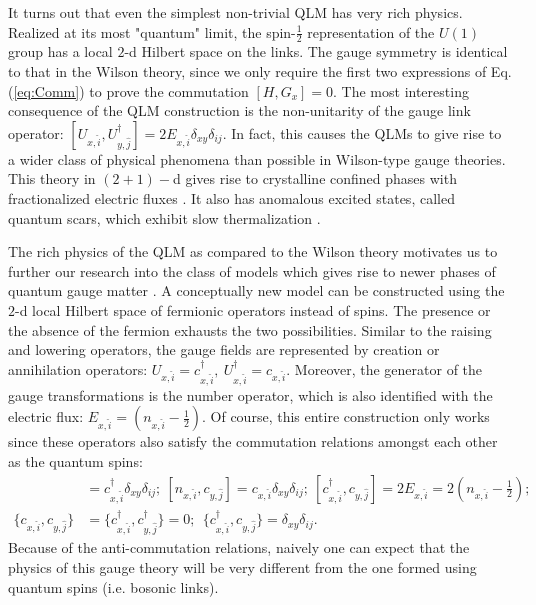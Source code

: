 \documentclass[a4paper,11pt]{article}
\begin{document}
 It turns out that even the simplest non-trivial QLM has very rich physics. Realized at its most "quantum"
limit, the spin-$\frac{1}{2}$ representation of the $U(1)$ group has a local $2$-d Hilbert space on the links. The 
gauge symmetry is identical to that in the Wilson theory, since we only require the first two expressions
of Eq. (\ref{eq:Comm}) to prove the commutation $[H,G_{x}] = 0$. The most interesting consequence of the 
QLM construction is the non-unitarity of the gauge link operator: 
$[U_{x,\hat{i}}, U_{y,\hat{j}}^\dagger] = 2 E_{x,\hat{i}} \delta_{xy} \delta_{ij}$. In fact, this causes the 
QLMs to give rise to a wider class of physical phenomena than possible in Wilson-type gauge theories.
This theory in $(2+1)-$d gives rise to crystalline confined phases with fractionalized electric fluxes 
\cite{Banerjee2013,Banerjee2021}. It also has anomalous excited states, called quantum scars, which exhibit slow
thermalization \cite{Banerjee2020}.
 
  The rich physics of the QLM as compared to the Wilson theory motivates us to further our research into the class
of models which gives rise to newer phases of quantum gauge matter \cite{Flink2021}. 
A conceptually new model can be constructed using the $2$-d local Hilbert space of fermionic operators instead of 
spins. The presence or the absence of the fermion exhausts the two possibilities. Similar to the raising and lowering 
operators, the gauge fields are represented by creation or annihilation operators: 
$U_{x,\hat{i}} = c^\dagger_{x,\hat{i}},~U^\dagger_{x,\hat{i}} = c_{x,\hat{i}}$. Moreover, the generator of the
gauge transformations is the number operator, which is also identified with the electric flux: 
$E_{x,\hat{i}} = (n_{x,\hat{i}} - \frac{1}{2})$. Of course, this entire construction only works since these 
operators also satisfy the commutation relations amongst each other as the quantum spins:
\begin{align}
[n_{x,\hat{i}}, c^\dagger_{y,\hat{j}}] &= c^\dagger_{x,\hat{i}} \delta_{xy} \delta_{ij};~
[n_{x,\hat{i}}, c_{y,\hat{j}}] = c_{x,\hat{i}} \delta_{xy} \delta_{ij};~
[c^\dagger_{x,\hat{i}}, c_{y,\hat{j}}] = 2 E_{x,\hat{i}} = 2 (n_{x,\hat{i}} - \frac{1}{2}); \\
\{c_{x,\hat{i}}, c_{y,\hat{j}} \} &= \{c^\dagger_{x,\hat{i}}, c^\dagger_{y,\hat{j}} \} = 0;~~
\{ c^\dagger_{x,\hat{i}}, c_{y,\hat{j}}  \} = \delta_{xy} \delta_{ij}.
\end{align}
Because of the anti-commutation relations, naively one can expect that the physics of this gauge theory
will be very different from the one formed using quantum spins (i.e. bosonic links).
\end{document}
